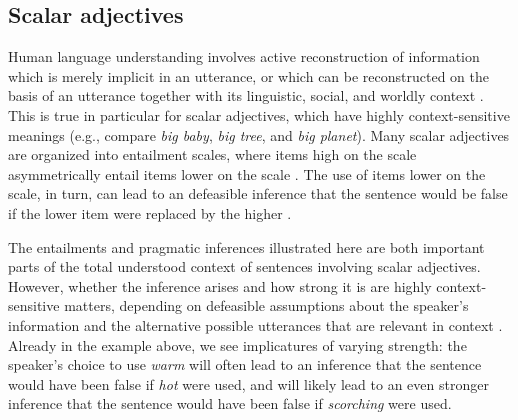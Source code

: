 \documentclass[10pt]{article}
\begin{document}
\subsection{Scalar adjectives}
Human language understanding involves active reconstruction of information which is merely implicit in an utterance, or which can be reconstructed on the basis of an utterance together with its linguistic, social, and worldly context \cite{grice1975logic,hobbs1993interpretation,clark1996using,hanna2003effects,piantadosi2012communicative}.
%
%
%
This is true in particular for scalar adjectives, which have highly context-sensitive meanings (e.g., compare \emph{big baby}, \emph{big tree}, and \emph{big planet}). Many scalar adjectives are organized into entailment scales, where items high on the scale asymmetrically entail items lower on the scale \cite{horn89,horn2000pick}. The use of items lower on the scale, in turn, can lead to an defeasible inference that the sentence would be false if the lower item were replaced by the higher \cite{grice1975logic,horn89}.
 \vspace{-.05in} 

 \vspace{-.05in}
The entailments and pragmatic inferences illustrated here are both important parts of the total understood context of sentences involving scalar adjectives. However, whether the inference arises and how strong it is are highly context-sensitive matters, depending on defeasible assumptions about the speaker's information and the alternative possible utterances that are relevant in context \cite{hirschberg1991theory,frank2012predicting,goodman2013knowledge}. Already in the example above, we see implicatures of varying strength: the speaker's choice to use \emph{warm} will often lead to an inference that the sentence would have been false if \emph{hot} were used, and will likely lead to an even stronger inference that the sentence would have been false if \emph{scorching} were used. 
\end{document}
